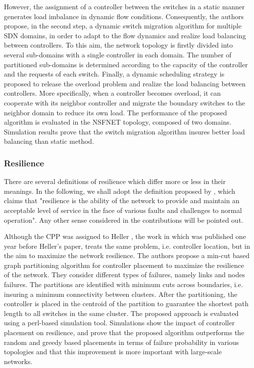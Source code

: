 \documentclass{IEEEtran}
\begin{document}
However, the assignment of a controller between the switches in a static manner generates load imbalance in dynamic flow conditions. Consequently, the authors propose, in the second step, a dynamic switch migration algorithm for multiple SDN domains, in order to adapt to the flow dynamics and realize load balancing between controllers. To this aim, the network topology is firstly divided into several sub-domains with a single controller in each domain. The number of partitioned sub-domains is determined according to the capacity of the controller and the requests of each switch. Finally, a dynamic scheduling strategy is proposed to release the overload problem and realize the load balancing between controllers. More specifically, when a controller becomes overload, it can cooperate with its neighbor controller and migrate the boundary switches to the neighbor domain to reduce its own load. The performance of the proposed algorithm is evaluated in the NSFNET topology, composed of two domains. Simulation results prove that the switch migration algorithm insures better load balancing than static method. %



\subsubsection{Resilience}
There are several definitions of resilience which differ more or less in their meanings. In the following, we shall adopt the definition proposed by \cite{StHu07}, which claims that   "resilience is the ability of the network to provide and maintain an acceptable level of service in the face of various faults and challenges to normal operation".  Any other sense considered in the contributions will be pointed out.

Although the CPP was assigned to Heller \cite{HeSh12}, the work in \cite{ZhBe11} which was published one year before Heller's paper, treats the same problem, i.e. controller location, but in the aim to maximize the network resilience. The authors propose a min-cut based graph partitioning algorithm for controller placement to maximize the resilience of the network. They consider different types of failures, namely links and nodes failures. The partitions are identified with minimum cuts across boundaries, i.e. insuring a minimum connectivity between clusters. After the partitioning, the controller is placed in the centroid of the partition to guarantee the shortest path length to all switches in the same cluster. The proposed approach is evaluated using a perl-based simulation tool. Simulations show the impact of controller placement on resilience, and prove that the proposed algorithm outperforms the random and greedy based placements in terms of failure probability in various topologies and that this improvement is more important with large-scale networks. 
\end{document}

